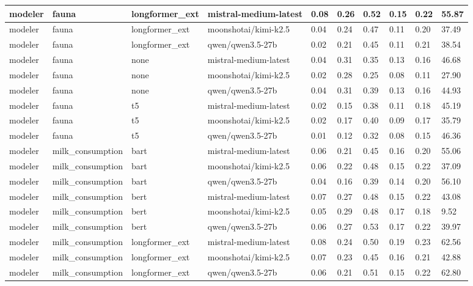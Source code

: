 \begin{tabular}{|l|l|l|l|l|l|l|l|l|l|}
 \hline
 modeler & fauna & longformer\_ext & mistral-medium-latest & 0.08 & 0.26 & 0.52 & 0.15 & 0.22 & 55.87 \\
 \hline
 modeler & fauna & longformer\_ext & moonshotai/kimi-k2.5 & 0.04 & 0.24 & 0.47 & 0.11 & 0.20 & 37.49 \\
 \hline
 modeler & fauna & longformer\_ext & qwen/qwen3.5-27b & 0.02 & 0.21 & 0.45 & 0.11 & 0.21 & 38.54 \\
 \hline
 modeler & fauna & none & mistral-medium-latest & 0.04 & 0.31 & 0.35 & 0.13 & 0.16 & 46.68 \\
 \hline
 modeler & fauna & none & moonshotai/kimi-k2.5 & 0.02 & 0.28 & 0.25 & 0.08 & 0.11 & 27.90 \\
 \hline
 modeler & fauna & none & qwen/qwen3.5-27b & 0.04 & 0.31 & 0.39 & 0.13 & 0.16 & 44.93 \\
 \hline
 modeler & fauna & t5 & mistral-medium-latest & 0.02 & 0.15 & 0.38 & 0.11 & 0.18 & 45.19 \\
 \hline
 modeler & fauna & t5 & moonshotai/kimi-k2.5 & 0.02 & 0.17 & 0.40 & 0.09 & 0.17 & 35.79 \\
 \hline
 modeler & fauna & t5 & qwen/qwen3.5-27b & 0.01 & 0.12 & 0.32 & 0.08 & 0.15 & 46.36 \\
 \hline
 modeler & milk\_consumption & bart & mistral-medium-latest & 0.06 & 0.21 & 0.45 & 0.16 & 0.20 & 55.06 \\
 \hline
 modeler & milk\_consumption & bart & moonshotai/kimi-k2.5 & 0.06 & 0.22 & 0.48 & 0.15 & 0.22 & 37.09 \\
 \hline
 modeler & milk\_consumption & bart & qwen/qwen3.5-27b & 0.04 & 0.16 & 0.39 & 0.14 & 0.20 & 56.10 \\
 \hline
 modeler & milk\_consumption & bert & mistral-medium-latest & 0.07 & 0.27 & 0.48 & 0.15 & 0.22 & 43.08 \\
 \hline
 modeler & milk\_consumption & bert & moonshotai/kimi-k2.5 & 0.05 & 0.29 & 0.48 & 0.17 & 0.18 & 9.52 \\
 \hline
 modeler & milk\_consumption & bert & qwen/qwen3.5-27b & 0.06 & 0.27 & 0.53 & 0.17 & 0.22 & 39.97 \\
 \hline
 modeler & milk\_consumption & longformer\_ext & mistral-medium-latest & 0.08 & 0.24 & 0.50 & 0.19 & 0.23 & 62.56 \\
 \hline
 modeler & milk\_consumption & longformer\_ext & moonshotai/kimi-k2.5 & 0.07 & 0.23 & 0.45 & 0.16 & 0.21 & 42.88 \\
 \hline
 modeler & milk\_consumption & longformer\_ext & qwen/qwen3.5-27b & 0.06 & 0.21 & 0.51 & 0.15 & 0.22 & 62.80 \\

\end{tabular}
